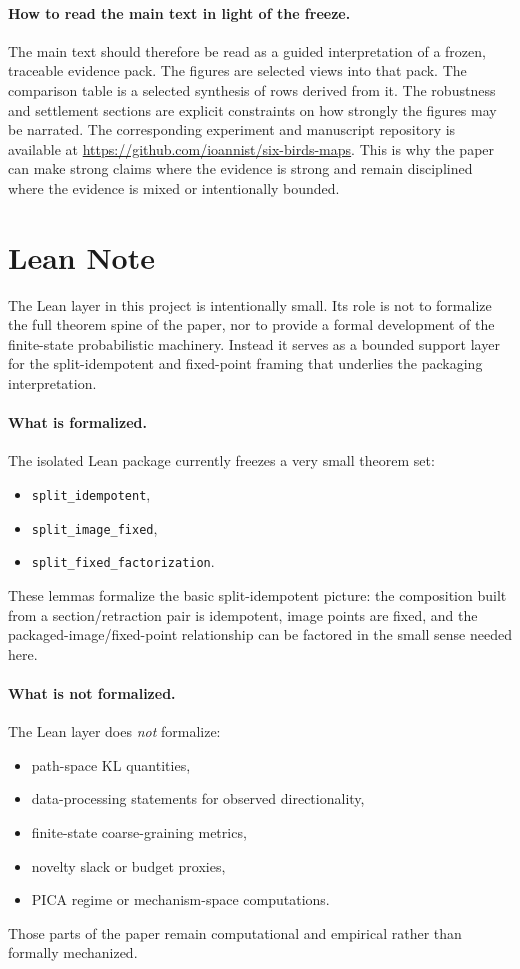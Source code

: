 \documentclass[11pt]{article}
\theoremstyle{definition}
\begin{document}
\paragraph{How to read the main text in light of the freeze.}
The main text should therefore be read as a guided interpretation of a frozen, traceable evidence pack. The figures are selected views into that pack. The comparison table is a selected synthesis of rows derived from it. The robustness and settlement sections are explicit constraints on how strongly the figures may be narrated. The corresponding experiment and manuscript repository is available at \url{https://github.com/ioannist/six-birds-maps}. This is why the paper can make strong claims where the evidence is strong and remain disciplined where the evidence is mixed or intentionally bounded.
 \section{Lean Note}
\label{app:lean}

The Lean layer in this project is intentionally small. Its role is not to formalize the full theorem spine of the paper, nor to provide a formal development of the finite-state probabilistic machinery. Instead it serves as a bounded support layer for the split-idempotent and fixed-point framing that underlies the packaging interpretation.

\paragraph{What is formalized.}
The isolated Lean package currently freezes a very small theorem set:
\begin{itemize}
    \item \texttt{split\_idempotent},
    \item \texttt{split\_image\_fixed},
    \item \texttt{split\_fixed\_factorization}.
\end{itemize}
These lemmas formalize the basic split-idempotent picture: the composition built from a section/retraction pair is idempotent, image points are fixed, and the packaged-image/fixed-point relationship can be factored in the small sense needed here.

\paragraph{What is not formalized.}
The Lean layer does \emph{not} formalize:
\begin{itemize}
    \item path-space KL quantities,
    \item data-processing statements for observed directionality,
    \item finite-state coarse-graining metrics,
    \item novelty slack or budget proxies,
    \item PICA regime or mechanism-space computations.
\end{itemize}
Those parts of the paper remain computational and empirical rather than formally mechanized.
\end{document}
